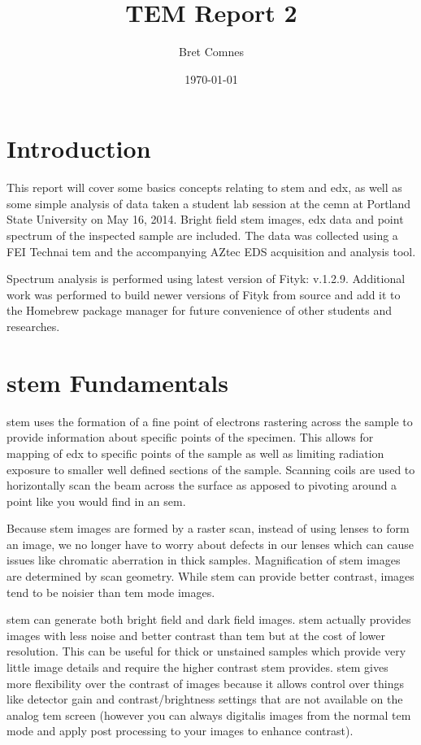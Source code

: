 \documentclass[12pt,a4paper]{article}
\title{TEM Report 2}
\author{Bret Comnes}
\date{\today}
\begin{document}
\maketitle

\section{Introduction} %

This report will cover some basics concepts relating to \ac{stem} and \ac{edx}, as well as some simple analysis of data taken a student lab session at the \ac{cemn} at Portland State University on May 16, 2014.  Bright field \ac{stem} images, \ac{edx} data and point spectrum of the inspected sample are included.  The data was collected using a FEI Technai \ac{tem} and the accompanying AZtec EDS acquisition and analysis tool.

Spectrum analysis is performed using latest version of Fityk\cite{ft}: v.1.2.9.  Additional work was performed to build newer versions of Fityk from source and add it to the Homebrew\cite{home} package manager for future convenience of other students and researches.


\section{\ac{stem} Fundamentals} %
\label{sec:stem}

\ac{stem} uses the formation of a fine point of electrons rastering across the sample to provide information about specific points of the specimen.  This allows for mapping of \ac{edx} to specific points of the sample as well as limiting radiation exposure to smaller well defined sections of the sample.  Scanning coils are used to horizontally scan the beam across the surface as apposed to pivoting around a point like you would find in an \ac{sem}.

Because \ac{stem} images are formed by a raster scan, instead of using lenses to form an image, we no longer have to worry about defects in our lenses which can cause issues like chromatic aberration in thick samples.  Magnification of \ac{stem} images are determined by scan geometry.  While \ac{stem} can provide better contrast, images tend to be noisier than \ac{tem} mode images.  \cite{tem}  

\ac{stem} can generate both bright field and dark field images.  \ac{stem} actually provides images with less noise and better contrast than \ac{tem} but at the cost of lower resolution.  This can be useful for thick or unstained samples which provide very little image details and require the higher contrast \ac{stem} provides.  \ac{stem} gives more flexibility over the contrast of images because it allows control over things like detector gain and contrast/brightness settings that are not available on the analog \ac{tem} screen  (however you can always digitalis images from the normal \ac{tem} mode and apply post processing to your images to enhance contrast).  
\end{document}
